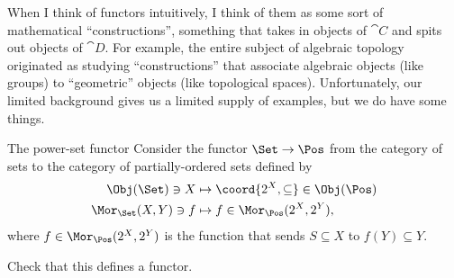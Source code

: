 When I think of functors intuitively, I think of them as some sort of mathematical ``constructions'', something that takes in objects of $\cat{C}$ and spits out objects of $\cat{D}$.  For example, the entire subject of algebraic topology originated as studying ``constructions'' that associate algebraic objects (like groups) to ``geometric'' objects (like topological spaces).  Unfortunately, our limited background gives us a limited supply of examples, but we do have some things.
\begin{exm}{The power-set functor}{}
	Consider the functor $\Set \rightarrow \Pos$ from the category of sets to the category of partially-ordered sets defined by
	\begin{subequations}
		\begin{align}
			\Obj (\Set )\ni X & \mapsto \coord{2^X,\subseteq}\in \Obj (\Pos ) \\
			\Mor _{\Set}(X,Y)\ni f & \mapsto f\in \Mor _{\Pos}(2^X,2^Y),
		\end{align}
	\end{subequations}
	where $f\in \Mor _{\Pos}(2^X,2^Y)$ is the function that sends $S\subseteq X$ to $f(Y)\subseteq Y$.
	\begin{exr}[breakable=false]{}{}
		Check that this defines a functor.
	\end{exr}
\end{exm}

